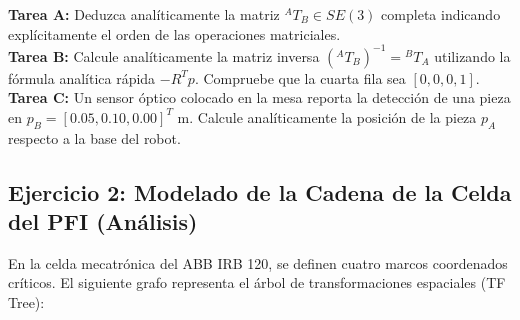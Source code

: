 \documentclass[11pt, a4paper]{article}
\begin{document}
\noindent\textbf{Tarea A:} Deduzca analíticamente la matriz $^{A}T_B \in SE(3)$ completa indicando explícitamente el orden de las operaciones matriciales.\\
\noindent\textbf{Tarea B:} Calcule analíticamente la matriz inversa $(^{A}T_B)^{-1} = {}^{B}T_A$ utilizando la fórmula analítica rápida $-R^T p$. Compruebe que la cuarta fila sea $[0, 0, 0, 1]$.\\
\noindent\textbf{Tarea C:} Un sensor óptico colocado en la mesa reporta la detección de una pieza en $p_B = [0.05, 0.10, 0.00]^T \text{ m}$. Calcule analíticamente la posición de la pieza $p_A$ respecto a la base del robot.

\subsection*{Ejercicio 2: Modelado de la Cadena de la Celda del PFI (Análisis)}
En la celda mecatrónica del ABB IRB 120, se definen cuatro marcos coordenados críticos. El siguiente grafo representa el árbol de transformaciones espaciales (TF Tree):
\end{document}
